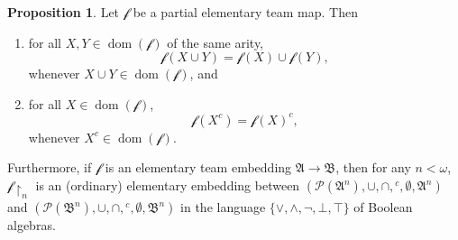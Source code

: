 \documentclass[a4paper]{amsart}
\theoremstyle{definition}
\newtheorem{proposition}[definition]{Proposition}
\theoremstyle{remark}
\renewcommand{\restriction}{ {\upharpoonright} }
\newcommand{\A}{\mathcal{A}}
\newcommand{\B}{\mathcal{B}}
\DeclareMathOperator{\Pow}{\wp}
\DeclareMathOperator{\dom}{dom}
\theoremstyle{definition}
\renewcommand{\A}{\mathfrak{A}}
\renewcommand{\B}{\mathfrak{B}}
\newcommand{\f}{\mathcal{f}}
\renewcommand{\Pow}{\mathcal{P}}
\begin{document}
\begin{proposition}
    Let $\f$ be a partial elementary team map. Then
    \begin{enumerate}
        \item for all $X,Y\in\dom(\f)$ of the same arity,
        \[
            \f(X\cup Y) = \f(X)\cup\f(Y),
        \]
        whenever $X\cup Y\in\dom(\f)$, and
        \item for all $X\in\dom(\f)$,
        \[
            \f(X^c) = \f(X)^c,
        \]
        whenever $X^c\in\dom(\f)$.
    \end{enumerate}
    Furthermore, if $\f$ is an elementary team embedding $\A\to\B$, then for any $n<\omega$, $\f\restriction_n$ is an (ordinary) elementary embedding between $(\Pow(\A^n),\cup,\cap,{}^c,\emptyset,\A^n)$ and $(\Pow(\B^n),\cup,\cap,{}^c,\emptyset,\B^n)$ in the language $\{\lor,\land,\neg,\bot,\top\}$ of Boolean algebras.
\end{proposition}
\end{document}

